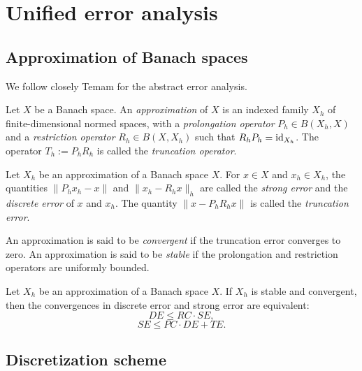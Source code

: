 \documentclass[12pt]{article}
\begin{document}
\tableofcontents

\newpage
\section{Unified error analysis}

\subsection{Approximation of Banach spaces}
We follow closely Temam for the abstract error analysis.
\begin{defn}[Approximation]
Let $X$ be a Banach space.
An \emph{approximation} of $X$ is an indexed family $X_h$ of finite-dimensional normed spaces, with a \emph{prolongation operator} $P_h\in B(X_h,X)$ and a \emph{restriction operator} $R_h\in B(X,X_h)$ such that $R_hP_h=\operatorname{id}_{X_h}$.
The operator $T_h:=P_hR_h$ is called the \emph{truncation operator}.
\end{defn}

\begin{defn}[Errors]
Let $X_h$ be an approximation of a Banach space $X$.
For $x\in X$ and $x_h\in X_h$, the quantities $\|P_hx_h-x\|$ and $\|x_h-R_hx\|_h$ are called the \emph{strong error} and the \emph{discrete error} of $x$ and $x_h$.
The quantity $\|x-P_hR_hx\|$ is called the \emph{truncation error}.
\end{defn}

\begin{defn}
An approximation is said to be \emph{convergent} if the truncation error converges to zero.
An approximation is said to be \emph{stable} if the prolongation and restriction operators are uniformly bounded.
\end{defn}
\begin{lem}
Let $X_h$ be an approximation of a Banach space $X$.
If $X_h$ is stable and convergent, then the convergences in discrete error and strong error are equivalent:
\[DE\le RC\cdot SE,\]
\[SE\le PC\cdot DE+TE.\]
\end{lem}

\begin{ex}

\end{ex}



\subsection{Discretization scheme}
\end{document}
